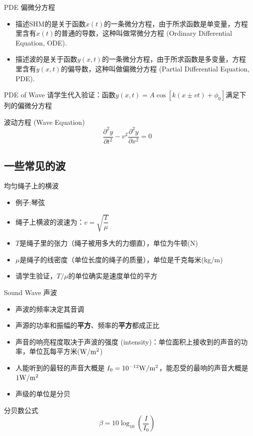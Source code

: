 \documentclass{beamer}
\newcommand{\stuname}{学生}
\begin{document}
\begin{frame}{PDE 偏微分方程}
	\begin{itemize}
		\item 描述SHM的是关于函数$x(t)$的一条微分方程，由于所求函数是单变量，方程里含有$x(t)$的普通的导数，这种叫做常微分方程 (Ordinary Differential Equation, ODE).
		\item 描述波的是关于函数$y(x, t)$的一条微分方程，由于所求函数是多变量，方程里含有$y(x, t)$的偏导数，这种叫做偏微分方程 (Partial Differential Equation, PDE).
	\end{itemize}
\end{frame}

\begin{frame}{PDE of Wave}
	请\stuname 代入验证：函数$y\left(x, t\right) = A \cos \left[k\left(x \pm vt\right) + \phi_0\right]$满足下列的偏微分方程
	
	\begin{block}{波动方程 (Wave Equation)}
		\[\frac{\partial^2 y}{\partial t^2} - v^2\frac{\partial^2 y}{\partial x^2} = 0\]
	\end{block}
\end{frame}

\subsection{一些常见的波}

\begin{frame}{均匀绳子上的横波}
	\begin{itemize}
		\item 例子:琴弦
		\item 绳子上横波的波速为：$v = \sqrt{\dfrac{T}{\mu}}$
		\item $T$是绳子里的张力（绳子被用多大的力绷直），单位为牛顿(N)
		\item $\mu$是绳子的线密度（单位长度的绳子的质量），单位是千克每米(kg/m)
		\item 请\stuname 验证，$T/\mu$的单位确实是速度单位的平方
	\end{itemize}
\end{frame}

\begin{frame}{Sound Wave 声波}
	\begin{itemize}
		\item 声波的频率决定其音调
		\item 声源的功率和振幅的\textbf{平方}、频率的\textbf{平方}都成正比
		\item 声音的响亮程度取决于声波的强度 (intensity)：单位面积上接收到的声音的功率，单位瓦每平方米(${\rm W/m^2}$)
		\item 人能听到的最轻的声音大概是 $I_0=10^{-12} {\rm W/m^2}$，能忍受的最响的声音大概是$1 {\rm W/m^2}$
		\item 声级的单位是分贝
	\end{itemize}
	\begin{block}{分贝数公式}
		\[\beta = 10 \log_{10}\left(\frac{I}{I_0}\right) \]
	\end{block}
\end{frame}
\end{document}
